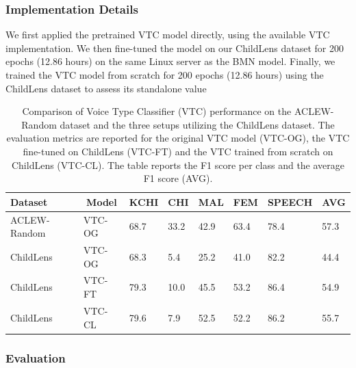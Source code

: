 \documentclass[
  man,floatsintext]{apa6}
\begin{document}
\subsubsection{Implementation Details}\label{implementation-details-1}

We first applied the pretrained VTC model directly, using the available VTC implementation. We then fine-tuned the model on our ChildLens dataset for 200 epochs (12.86 hours) on the same Linux server as the BMN model. Finally, we trained the VTC model from scratch for 200 epochs (12.86 hours) using the ChildLens dataset to assess its standalone value

\begin{table}[tbp]

\begin{center}
\begin{threeparttable}

\caption{\label{tab:vtc-results}Comparison of Voice Type Classifier (VTC) performance on the ACLEW-Random dataset and the three setups utilizing the ChildLens dataset. The evaluation metrics are reported for the original VTC model (VTC-OG), the VTC fine-tuned on ChildLens (VTC-FT) and the VTC trained from scratch on ChildLens (VTC-CL). The table reports the F1 score per class and the average F1 score (AVG).
}

\begin{tabular}{llllllll}
\toprule
Dataset & \multicolumn{1}{c}{Model} & \multicolumn{1}{c}{KCHI} & \multicolumn{1}{c}{CHI} & \multicolumn{1}{c}{MAL} & \multicolumn{1}{c}{FEM} & \multicolumn{1}{c}{SPEECH} & \multicolumn{1}{c}{AVG}\\
\midrule
ACLEW-Random & VTC-OG & 68.7 & 33.2 & 42.9 & 63.4 & 78.4 & 57.3\\
ChildLens & VTC-OG & 68.3 & 5.4 & 25.2 & 41.0 & 82.2 & 44.4\\
ChildLens & VTC-FT & 79.3 & 10.0 & 45.5 & 53.2 & 86.4 & 54.9\\
ChildLens & VTC-CL & 79.6 & 7.9 & 52.5 & 52.2 & 86.2 & 55.7\\
\bottomrule
\end{tabular}

\end{threeparttable}
\end{center}

\end{table}

\subsubsection{Evaluation}\label{evaluation-1}
\end{document}
